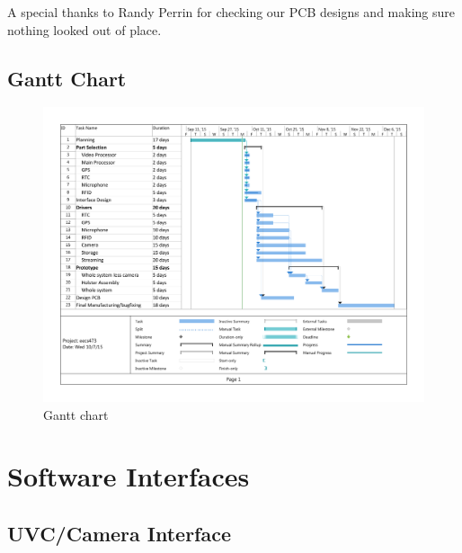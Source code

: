 \documentclass[12pt]{article}
\begin{document}
A special thanks to Randy Perrin for checking our PCB designs and making sure
nothing looked out of place.

\newpage




\newpage

\appendix

\begin{landscape}
    \section{Gantt Chart}
    \label{app:gantt}
    \thispagestyle{empty}

    \begin{figure}[h!]
        \centering
        \includegraphics[width=1.1\textwidth]{gantt}
        \caption{Gantt chart}
        \label{fig:gantt}
    \end{figure}
\end{landscape}

\newpage

\section{Software Interfaces}
\label{app:software_interfaces}

\subsection{UVC/Camera Interface}

\end{document}
